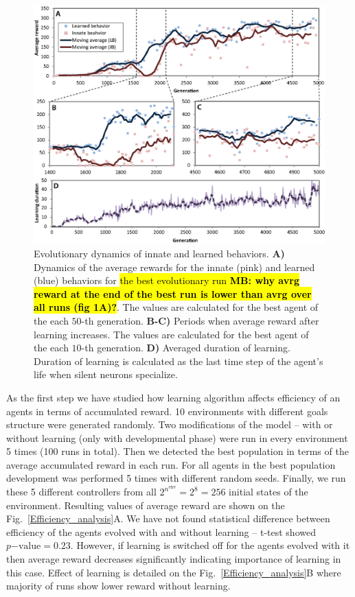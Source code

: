 \documentclass[letterpaper]{article}
\begin{document}
\begin{figure}[!t]
	\begin{center}
	\includegraphics[width=16cm]{Fig3_Behavior_Evolution.eps}
	\caption{Evolutionary dynamics of innate and learned behaviors. \textbf{A)} Dynamics of the average rewards for the innate (pink) and learned (blue) behaviors for \hl{the best evolutionary run \textbf{MB: why avrg reward at the end of the best run is lower than avrg over all runs (fig 1A)?}}. The values are calculated for the best agent of the each $50$-th generation. \textbf{B-C)} Periods when average reward after learning increases. The values are calculated for the best agent of the each $10$-th generation. \textbf{D)} Averaged duration of learning. Duration of learning is calculated as the last time step of the agent's life when silent neurons specialize.}
	\label{Behavior_Evolution}
	\end{center}
\end{figure}

As the first step we have studied how learning algorithm affects efficiency of an agents in terms of accumulated reward. 10 environments with different goals structure were generated randomly. Two modifications of the model -- with or without learning (only with developmental phase) were run in every environment 5 times (100 runs in total). Then we detected the best population in terms of the average accumulated reward in each run. For all agents in the best population development was performed 5 times with different random seeds. Finally, we run these 5 different controllers from all $2^{n^{\mathrm{env}}}=2^8=256$ initial states of the environment. Resulting values of average reward are shown on the Fig.~\ref{Efficiency_analysis}A. We have not found statistical difference between efficiency of the agents evolved with and without learning -- t-test showed $p\mathrm{-value}=0.23$. However, if learning is switched off for the agents evolved with it then average reward decreases significantly indicating importance of learning in this case.  Effect of learning is detailed on the Fig.~\ref{Efficiency_analysis}B where majority of runs show lower reward without learning.  
\end{document}
